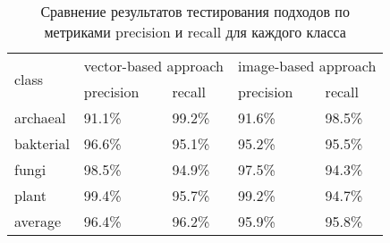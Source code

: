 \begin{table}[h]
\begin{tabular}{|l|l|l|l|l|}
\hline
\multirow{2}{*}{class} & \multicolumn{2}{l|}{vector-based approach} & \multicolumn{2}{l|}{image-based approach} \\ \cline{2-5} 
                       & precision             & recall             & precision             & recall            \\ \hline
archaeal               & 91.1\%                & 99.2\%             & 91.6\%                & 98.5\%            \\ \hline
bakterial              & 96.6\%                & 95.1\%             & 95.2\%                & 95.5\%            \\ \hline
fungi                  & 98.5\%                & 94.9\%             & 97.5\%                & 94.3\%            \\ \hline
plant                  & 99.4\%                & 95.7\%             & 99.2\%                & 94.7\%            \\ \hline
average                  & 96.4\%                & 96.2\%             & 95.9\%                & 95.8\%            \\ \hline
\end{tabular}
\caption{Сравнение результатов тестирования подходов по метриками precision и recall для каждого класса}
\label{metrics_abfp}
\end{table}